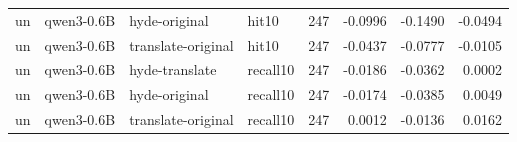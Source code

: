 \begin{tabular}{llllrrrr}
un & qwen3-0.6B & hyde-original & hit10 & 247 & -0.0996 & -0.1490 & -0.0494 \\
un & qwen3-0.6B & translate-original & hit10 & 247 & -0.0437 & -0.0777 & -0.0105 \\
un & qwen3-0.6B & hyde-translate & recall10 & 247 & -0.0186 & -0.0362 & 0.0002 \\
un & qwen3-0.6B & hyde-original & recall10 & 247 & -0.0174 & -0.0385 & 0.0049 \\
un & qwen3-0.6B & translate-original & recall10 & 247 & 0.0012 & -0.0136 & 0.0162 \\
\bottomrule
\end{tabular}
